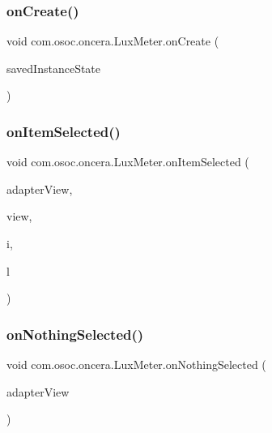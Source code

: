 \subsubsection{\texorpdfstring{onCreate()}{onCreate()}}
{\footnotesize\ttfamily void com.\+osoc.\+oncera.\+Lux\+Meter.\+on\+Create (\begin{DoxyParamCaption}\item[{Bundle}]{saved\+Instance\+State }\end{DoxyParamCaption})\hspace{0.3cm}{\ttfamily [protected]}}

\mbox{\label{classcom_1_1osoc_1_1oncera_1_1_lux_meter_aeba7eb0c74354876c8df7a03e7ede8a4}} 
\subsubsection{\texorpdfstring{onItemSelected()}{onItemSelected()}}
{\footnotesize\ttfamily void com.\+osoc.\+oncera.\+Lux\+Meter.\+on\+Item\+Selected (\begin{DoxyParamCaption}\item[{Adapter\+View$<$?$>$}]{adapter\+View,  }\item[{View}]{view,  }\item[{int}]{i,  }\item[{long}]{l }\end{DoxyParamCaption})}

\mbox{\label{classcom_1_1osoc_1_1oncera_1_1_lux_meter_afd145bd9d12862d9dcdacba78a59b943}} 
\subsubsection{\texorpdfstring{onNothingSelected()}{onNothingSelected()}}
{\footnotesize\ttfamily void com.\+osoc.\+oncera.\+Lux\+Meter.\+on\+Nothing\+Selected (\begin{DoxyParamCaption}\item[{Adapter\+View$<$?$>$}]{adapter\+View }\end{DoxyParamCaption})}

